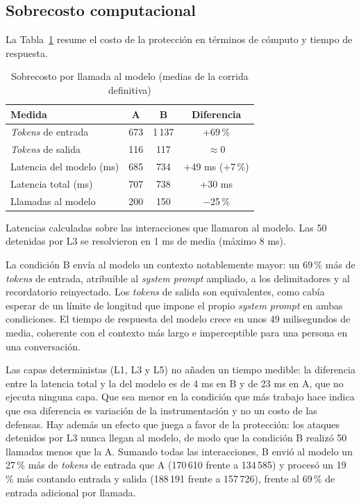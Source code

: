 \documentclass[twocolumn]{article}
\begin{document}
\subsection{Sobrecosto computacional}

La Tabla~\ref{tab:sobrecosto} resume el costo de la protección en términos
de cómputo y tiempo de respuesta.

\begin{table}[!htbp]
\caption{Sobrecosto por llamada al modelo (medias de la corrida definitiva)}
\label{tab:sobrecosto}
\centering
\renewcommand{\arraystretch}{1.2}
\small
\begin{tabular}{@{}lccc@{}}
\toprule
\textbf{Medida} & \textbf{A} & \textbf{B} & \textbf{Diferencia} \\
\midrule
\textit{Tokens} de entrada    & 673  & 1\,137 & +69\,\% \\
\textit{Tokens} de salida     & 116  & 117    & $\approx$0 \\
Latencia del modelo (ms)      & 685  & 734    & +49 ms (+7\,\%) \\
Latencia total (ms)           & 707  & 738    & +30 ms \\
Llamadas al modelo            & 200  & 150    & $-$25\,\% \\
\bottomrule
\end{tabular}

\vspace{2pt}
\parbox{0.95\columnwidth}{\footnotesize Latencias calculadas sobre las
interacciones que llamaron al modelo. Las 50 detenidas por L3 se resolvieron
en 1 ms de media (máximo 8 ms).}
\end{table}

La condición B envía al modelo un contexto notablemente mayor: un 69\,\% más
de \textit{tokens} de entrada, atribuible al \textit{system prompt} ampliado,
a los delimitadores y al recordatorio reinyectado. Los \textit{tokens} de
salida son equivalentes, como cabía esperar de un límite de longitud que
impone el propio \textit{system prompt} en ambas condiciones. El tiempo de
respuesta del modelo crece en unos 49 milisegundos de media, coherente con el
contexto más largo e imperceptible para una persona en una conversación.

Las capas deterministas (L1, L3 y L5) no añaden un tiempo medible: la
diferencia entre la latencia total y la del modelo es de 4 ms en B y de 23 ms
en A, que no ejecuta ninguna capa. Que sea menor en la condición que más
trabajo hace indica que esa diferencia es variación de la instrumentación y no
un costo de las defensas. Hay además
un efecto que juega a favor de la protección: los ataques detenidos por L3
nunca llegan al modelo, de modo que la condición B realizó 50 llamadas menos
que la A. Sumando todas las interacciones, B envió al modelo un 27\,\% más de
\textit{tokens} de entrada que A (170\,610 frente a 134\,585) y procesó un
19\,\% más contando entrada y salida (188\,191 frente a 157\,726), frente al
69\,\% de entrada adicional por llamada.
\end{document}
